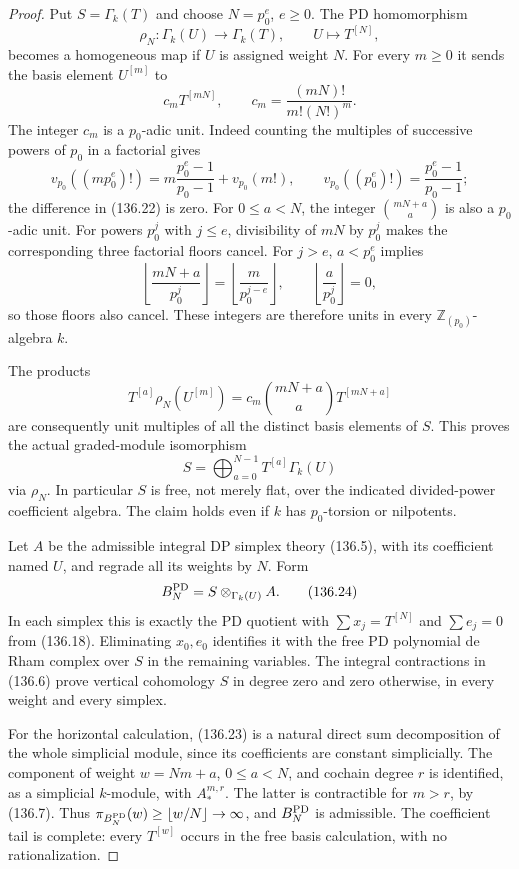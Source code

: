 \begin{proof}
Put $S=\Gamma_k(T)$ and choose $N=p_0^e$, $e\geq0$.
The PD homomorphism
\[
 \rho_N:\Gamma_k(U)\longrightarrow\Gamma_k(T),
                  \qquad U\longmapsto T^{[N]},              \tag{136.21}
\]
becomes a homogeneous map if $U$ is assigned weight $N$.
For every $m\geq0$ it sends the basis element $U^{[m]}$ to
\[
 c_mT^{[mN]},\qquad c_m=\frac{(mN)!}{m!(N!)^m}.
                                                               \tag{136.22}
\]
The integer $c_m$ is a $p_0$-adic unit.  Indeed counting the
multiples of successive powers of $p_0$ in a factorial gives
\[
 v_{p_0}((mp_0^e)!)
  =m\frac{p_0^e-1}{p_0-1}+v_{p_0}(m!),
 \qquad
 v_{p_0}((p_0^e)!)=\frac{p_0^e-1}{p_0-1};
\]
the difference in (136.22) is zero.
For $0\leq a<N$, the integer
$\binom{mN+a}{a}$ is also a $p_0$-adic unit.
For powers $p_0^j$ with $j\leq e$, divisibility of $mN$
by $p_0^j$ makes the corresponding three factorial floors
cancel.  For $j>e$, $a<p_0^e$ implies
\[
 \left\lfloor\frac{mN+a}{p_0^j}\right\rfloor
  =\left\lfloor\frac{m}{p_0^{j-e}}\right\rfloor,
 \qquad \left\lfloor\frac a{p_0^j}\right\rfloor=0,
\]
so those floors also cancel.  These integers are therefore
units in every $\mathbb Z_{(p_0)}$-algebra $k$.

The products
\[
 T^{[a]}\rho_N(U^{[m]})
    =c_m\binom{mN+a}{a}T^{[mN+a]}
\]
are consequently unit multiples of all the distinct basis
elements of $S$.  This proves the actual graded-module
isomorphism
\[
 S=\bigoplus_{a=0}^{N-1}T^{[a]}\Gamma_k(U)                 \tag{136.23}
\]
via $\rho_N$.  In particular $S$ is free, not merely flat,
over the indicated divided-power coefficient algebra.
The claim holds even if $k$ has $p_0$-torsion or nilpotents.

Let $A$ be the admissible integral DP simplex theory
(136.5), with its coefficient named $U$, and regrade
all its weights by $N$.  Form
\[
 B_N^{\rm PD}=S\otimes_{\Gamma_k(U)}A .                    \tag{136.24}
\]
In each simplex this is exactly the PD quotient with
$\sum x_j=T^{[N]}$ and $\sum e_j=0$ from (136.18).
Eliminating $x_0,e_0$ identifies it with the free PD
polynomial de Rham complex over $S$ in the remaining
variables.  The integral contractions in (136.6) prove
vertical cohomology $S$ in degree zero and zero otherwise,
in every weight and every simplex.

For the horizontal calculation, (136.23) is a natural
direct sum decomposition of the whole simplicial module,
since its coefficients are constant simplicially.
The component of weight $w=Nm+a$, $0\leq a<N$, and
cochain degree $r$ is identified, as a simplicial
$k$-module, with $A_*^{m,r}$.  The latter is contractible
for $m>r$, by (136.7).  Thus
$\pi_{B_N^{\rm PD}}(w)\geq\lfloor w/N\rfloor\to\infty$,
and $B_N^{\rm PD}$ is admissible.  The coefficient tail
is complete: every $T^{[w]}$ occurs in the free basis
calculation, with no rationalization.


\end{proof}
